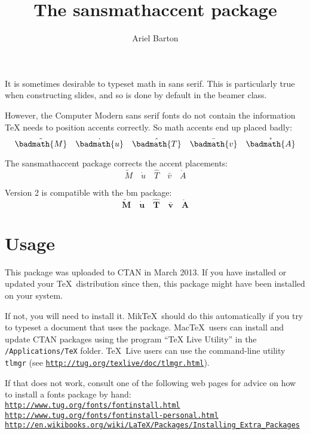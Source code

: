 \documentclass{amsart}
\title{The \textsf{sansmathaccent} package}
\author{Ariel Barton}
\begin{document}
\maketitle

It is sometimes desirable to typeset math in sans serif. This is
particularly true when constructing slides, and so is done by default in
the \textsf{beamer} class.

However, the Computer Modern sans serif fonts do not contain the
information TeX needs to position accents correctly. So math accents end
up placed badly:
$$ \tilde {\badmath{M}} \quad \dot {\badmath{u}} \quad 
\hat{{}\badmath{T}} \quad \bar {\badmath{v}} \quad 
\mathring {\badmath{A}}$$

The \textsf{sansmathaccent} package corrects the accent placements:
$$ \tilde M \quad \dot u \quad \hat{T} \quad \bar v \quad \mathring A$$

Version 2 is compatible with the \textsf{bm} package:
$$ \bm{\tilde M} \quad \bm{\dot u} \quad \bm{\hat{T}} \quad \bm{\bar v} 
\quad \bm{\mathring{A}}$$

\section{Usage}

This package was uploaded to CTAN in March 2013. If you have installed
or updated your \TeX\ distribution since then, this package might have
been installed on your system.

If not, you will need to install it. Mik\TeX\ should do this
automatically if you try to typeset a document that uses the package.
Mac\TeX\ users can install and update CTAN packages using the program
``TeX Live Utility'' in the \texttt{/Applications/TeX} folder. \TeX\
Live users can use the command-line utility \texttt{tlmgr} (see
\href{http://tug.org/texlive/doc/tlmgr.html}
{\texttt{http://tug.org/texlive/doc/tlmgr.html}}).

If that does not work, consult one of the following web pages for advice
on how to install a fonts package by hand:\\
\href{http://www.tug.org/fonts/fontinstall.html}
{\texttt{http://www.tug.org/fonts/fontinstall.html}}\\
\href{http://www.tug.org/fonts/fontinstall-personal.html}
{\texttt{http://www.tug.org/fonts/fontinstall-personal.html}}\\
\href{http://en.wikibooks.org/wiki/LaTeX/Packages/Installing_Extra_Packages}
{\texttt{http://en.wikibooks.org/wiki/LaTeX/Packages/Installing\_Extra\_Packages}}
\end{document}
